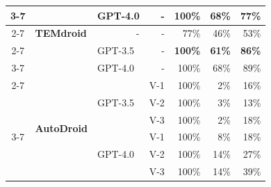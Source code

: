\begin{table}[t]
\begin{tabular}{c|l|l|l|r|r|r}
\cmidrule{3-7}          &       & GPT-4.0 & \multicolumn{1}{r|}{-} & 100\% & 68\%  & 77\% \\
\cmidrule{2-7}          & \textbf{TEMdroid} & \multicolumn{1}{r|}{-} & \multicolumn{1}{r|}{-} & 77\%  & 46\%  & 53\% \\
\cmidrule{2-7}          & \multirow{2}[4]{*}{\toolName{*}} & GPT-3.5 & \multicolumn{1}{r|}{-} & \textbf{100\%} & \textbf{61\%} & \textbf{86\%} \\
\cmidrule{3-7}          &       & GPT-4.0 & \multicolumn{1}{r|}{-} & 100\% & 68\%  & 89\% \\
\cmidrule{2-7}          & \multirow{6}[4]{*}{\textbf{AutoDroid}} & \multirow{3}[2]{*}{GPT-3.5} & V-1   & 100\% & 2\%   & 16\% \\
          &       &       & V-2   & 100\% & 3\%   & 13\% \\
          &       &       & V-3   & 100\% & 2\%   & 18\% \\
\cmidrule{3-7}          &       & \multirow{3}[2]{*}{GPT-4.0} & V-1   & 100\% & 8\%   & 18\% \\
          &       &       & V-2   & 100\% & 14\%  & 27\% \\
          &       &       & V-3   & 100\% & 14\%  & 39\% \\
    \bottomrule
    \end{tabular}%
  \label{tab:evaluation-FTDroid}%
\end{table}


